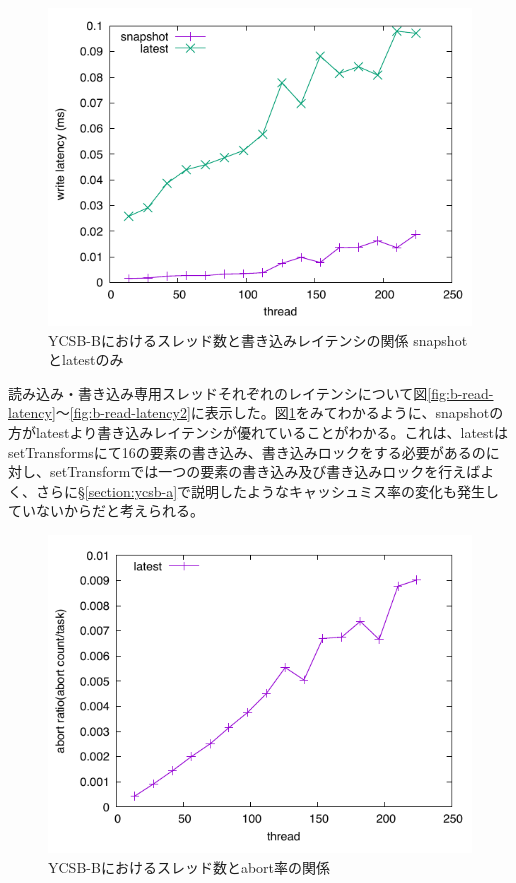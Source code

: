 \documentclass[a4paper]{jreport}	%
\begin{document}
\begin{figure}[h] 
\centering
\includegraphics[width=15cm]{ycsb-b/opposite-write-latency2}
\caption{YCSB-Bにおけるスレッド数と書き込みレイテンシの関係 snapshotとlatestのみ}
\label{fig:b-write-latency2}
\end{figure}

読み込み・書き込み専用スレッドそれぞれのレイテンシについて図\ref{fig:b-read-latency}〜\ref{fig:b-read-latency2}に表示した。図\ref{fig:b-write-latency2}をみてわかるように、snapshotの方がlatestより書き込みレイテンシが優れていることがわかる。これは、latestはsetTransformsにて16の要素の書き込み、書き込みロックをする必要があるのに対し、setTransformでは一つの要素の書き込み及び書き込みロックを行えばよく、さらに§\ref{section:ycsb-a}で説明したようなキャッシュミス率の変化も発生していないからだと考えられる。


\begin{figure}[h] 
\centering
\includegraphics[width=15cm]{ycsb-b/opposite-abort}
\caption{YCSB-Bにおけるスレッド数とabort率の関係}
\label{fig:b-abort}
\end{figure}
\end{document}
